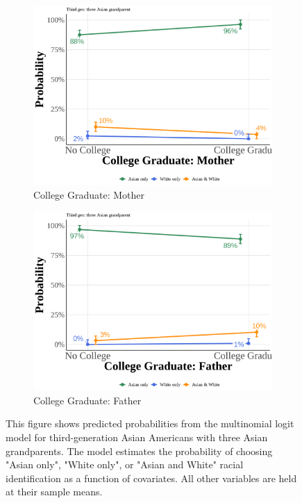 \begin{center}
\begin{figure}[!htb]
\vspace{0.5cm}

\begin{subfigure}{.48\textwidth}
\caption{College Graduate: Mother}
\centering
\includegraphics[width=1\linewidth]{simple_pp_MomGradCollege_third_three.png}
\end{subfigure}
\hfill
\begin{subfigure}{.48\textwidth}
\caption{College Graduate: Father}
\centering
\includegraphics[width=1\linewidth]{simple_pp_DadGradCollege_third_three.png}
\end{subfigure}

\caption*{\footnotesize{This figure shows predicted probabilities from the multinomial logit model for third-generation Asian Americans with three Asian grandparents. The model estimates the probability of choosing "Asian only", "White only", or "Asian and White" racial identification as a function of covariates. All other variables are held at their sample means.}}
\end{figure}
\end{center}

